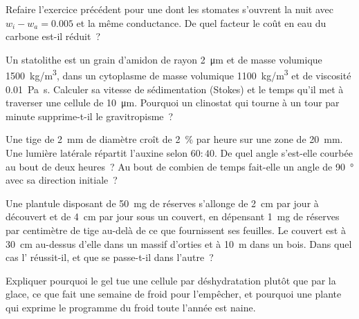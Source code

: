 \begin{exercise}[$\star\star$]\label{exo:b2:plant-plasticity:7}
Refaire l'exercice précédent pour une  dont les stomates
s'ouvrent la nuit avec $w_i - w_a = 0.005$ et la même conductance. De
quel facteur le coût en eau du carbone est-il réduit~?
\end{exercise}

\begin{exercise}[$\star\star$]\label{exo:b2:plant-plasticity:8}
Un statolithe est un grain d'amidon de rayon \qty{2}{\micro m} et de
masse volumique \qty{1500}{kg/m^3}, dans un cytoplasme de masse
volumique \qty{1100}{kg/m^3} et de viscosité \qty{0.01}{Pa.s}. Calculer
sa vitesse de sédimentation (Stokes) et le temps qu'il met à traverser
une cellule de \qty{10}{\micro m}. Pourquoi un clinostat qui tourne à
un tour par minute supprime-t-il le gravitropisme~?
\end{exercise}

\begin{exercise}[$\star\star$]\label{exo:b2:plant-plasticity:9}
Une tige de \qty{2}{mm} de diamètre croît de \qty{2}{\%} par heure sur
une zone de \qty{20}{mm}. Une lumière latérale répartit l'auxine selon
$60 : 40$. De quel angle s'est-elle courbée au bout de deux heures~? Au
bout de combien de temps fait-elle un angle de \qty{90}{\degree} avec sa
direction initiale~?
\end{exercise}

\begin{exercise}[$\star\star\star$]\label{exo:b2:plant-plasticity:10}
Une plantule disposant de \qty{50}{mg} de réserves s'allonge de
\qty{2}{cm} par jour à découvert et de \qty{4}{cm} par jour sous un
couvert, en dépensant \qty{1}{mg} de réserves par centimètre de tige
au-delà de ce que fournissent ses feuilles. Le couvert est à \qty{30}{cm}
au-dessus d'elle dans un massif d'orties et à \qty{10}{m} dans un bois.
Dans quel cas l' réussit-il, et que se passe-t-il
dans l'autre~?
\end{exercise}

\begin{exercise}[$\star\star\star$]\label{exo:b2:plant-plasticity:11}
Expliquer pourquoi le gel tue une cellule par déshydratation plutôt que
par la glace, ce que fait une semaine de froid pour l'empêcher, et
pourquoi une plante qui exprime le programme du froid toute l'année est
naine.
\end{exercise}

